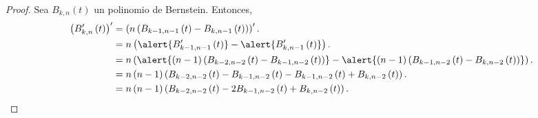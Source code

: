 \begin{frame}
    \begin{proof}
        Sea
        \begin{math}
            B_{k,n}\left(t\right)
        \end{math}
        un polinomio de Bernstein.
        Entonces,
        \begin{align*}
            {\left(
                B^{\prime}_{k,n}\left(t\right)
                \right)}^{\prime}
             & =
            \left(
            n
            \left(
            B_{k-1,n-1}\left(t\right)-
            B_{k,n-1}\left(t\right)
            \right)
            \right)^{\prime}. \\
             & =
            n\left(
            \alert{
                B^{\prime}_{k-1,n-1}\left(t\right)
            }    -
            \alert{
                B^{\prime}_{k,n-1}\left(t\right)
            }
            \right).          \\
             & =
            n\left(
            \alert{
                \left(n-1\right)
                \left(
                B_{k-2,n-2}\left(t\right)-
                B_{k-1,n-2}\left(t\right)
                \right)
            }    -
            \alert{
                \left(n-1\right)
                \left(
                B_{k-1,n-2}\left(t\right)-
                B_{k,n-2}\left(t\right)
                \right)
            }
            \right).          \\
             & =
            n\left(n-1\right)
            \left(
            B_{k-2,n-2}\left(t\right)-
            B_{k-1,n-2}\left(t\right)-
            B_{k-1,n-2}\left(t\right)+
            B_{k,n-2}\left(t\right)
            \right).          \\
             & =
            n\left(n-1\right)
            \left(
            B_{k-2,n-2}\left(t\right)-
            2B_{k-1,n-2}\left(t\right)+
            B_{k,n-2}\left(t\right)
            \right).
        \end{align*}
    \end{proof}
\end{frame}
